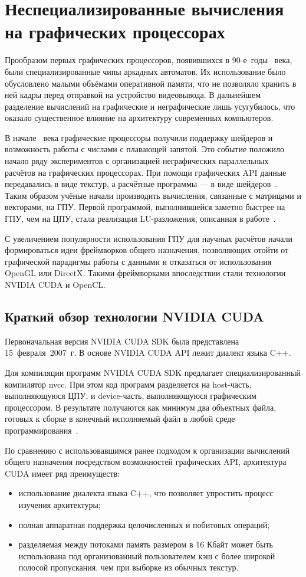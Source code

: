 \section{Неспециализированные вычисления на графических процессорах}

Прообразом первых графических процессоров, появившихся в \mbox{90-е}~годы
~века, были специализированные чипы аркадных автоматов. Их использование было обусловлено малыми объёмами оперативной памяти, что не позволяло хранить в ней кадры перед отправкой на устройство видеовывода. В
дальнейшем разделение вычислений на графические и неграфические лишь
усугубилось, что оказало существенное влияние на архитектуру современных
компьютеров.

В начале ~века графические процессоры получили поддержку шейдеров и возможность работы с числами с плавающей запятой. Это событие положило начало ряду экспериментов с организацией неграфических параллельных
расчётов на графических процессорах. При помощи графических API данные
передавались в виде текстур, а расчётные программы --- в виде шейдеров~\cite{Berillo}.
Таким образом учёные начали производить вычисления, связанные с матрицами и векторами, на ГПУ. Первой программой, выполнившейся заметно быстрее
на ГПУ, чем на ЦПУ, стала реализация LU-разложения, описанная в работе~\cite{Galoppo}.

С увеличением популярности использования ГПУ для научных расчётов
начали формироваться идеи фреймворков общего назначения, позволяющих
отойти от графической парадигмы работы с данными и отказаться от использования OpenGL или DirectX. Такими фреймворками впоследствии стали технологии NVIDIA CUDA и OpenCL.

\subsection{Краткий обзор технологии NVIDIA CUDA}

Первоначальная версия NVIDIA CUDA SDK была представлена 15~февраля~2007~г.
В основе NVIDIA CUDA API лежит диалект языка C++.

Для компиляции программ NVIDIA CUDA SDK предлагает специализированный компилятор nvcc. При этом код программ разделяется на host-часть, выполняющуюся ЦПУ, и device-часть, выполняющуюся графическим процессором. В результате получаются как минимум два объектных файла, готовых к сборке в
конечный исполняемый файл в любой среде программирования~\cite{CUDADoc}.

По сравнению с использовавшимся ранее подходом к организации вычислений общего назначения посредством возможностей графических API, архитектура CUDA имеет ряд преимуществ:
\begin{itemize}
\item использование диалекта языка C++, что позволяет упростить процесс изучения архитектуры;
\item  полная аппаратная поддержка целочисленных и побитовых операций;
\item  разделяемая между потоками память размером в 16 Кбайт может быть
использована под организованный пользователем кэш с более широкой полосой пропускания, чем при выборке из обычных текстур.
\end{itemize}

